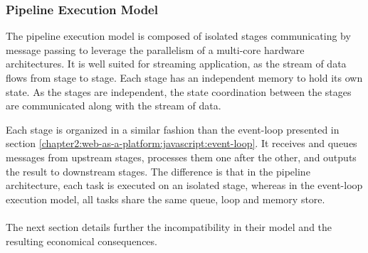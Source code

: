 \subsubsection{Pipeline Execution Model}

The pipeline execution model is composed of isolated stages communicating by message passing to leverage the parallelism of a multi-core hardware architectures.
It is well suited for streaming application, as the stream of data flows from stage to stage.
Each stage has an independent memory to hold its own state.
As the stages are independent, the state coordination between the stages are communicated along with the stream of data.


Each stage is organized in a similar fashion than the event-loop presented in section \ref{chapter2:web-as-a-platform:javascript:event-loop}.
It receives and queues messages from upstream stages, processes them one after the other, and outputs the result to downstream stages.
The difference is that in the pipeline architecture, each task is executed on an isolated stage, whereas in the event-loop execution model, all tasks share the same queue, loop and memory store.

\paragraph{}

The next section details further the incompatibility in their model and the resulting economical consequences.
